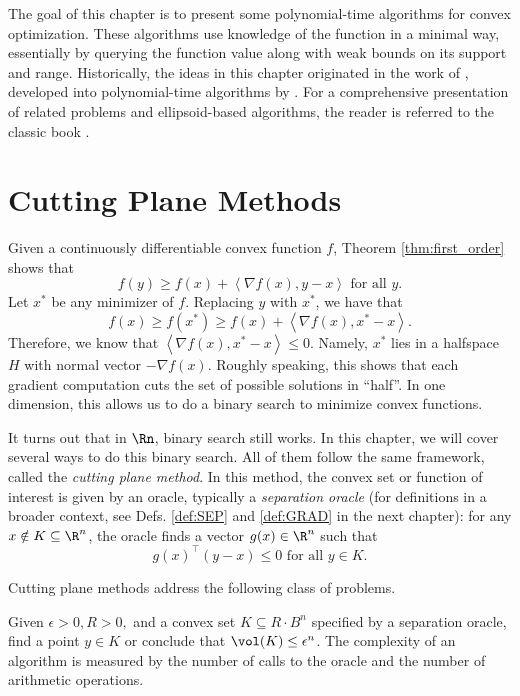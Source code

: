 The goal of this chapter is to present some polynomial-time algorithms
for convex optimization. These algorithms use knowledge of the function
in a minimal way, essentially by querying the function value along
with weak bounds on its support and range. Historically, the ideas
in this chapter originated in the work of \cite{Grunbaum1960,yudin1976evaluation},
developed into polynomial-time algorithms by \cite{khachiyan1980polynomial,grotschel1981ellipsoid,bertsimas2004solving}.
For a comprehensive presentation of related problems and ellipsoid-based
algorithms, the reader is referred to the classic book \cite{grotschel2012geometric}. 

\section{Cutting Plane Methods\label{sec:Cutting-Plane-Methods}}

Given a continuously differentiable convex function $f$, Theorem
\ref{thm:first_order} shows that
\begin{equation}
f(y)\geq f(x)+\left\langle \nabla f(x),y-x\right\rangle \text{ for all }y.\label{eq:sub_grad_def}
\end{equation}
Let $x^{*}$ be any minimizer of $f$. Replacing $y$ with $x^{*}$,
we have that 
\[
f(x)\geq f(x^{*})\geq f(x)+\left\langle \nabla f(x),x^{*}-x\right\rangle .
\]
Therefore, we know that $\left\langle \nabla f(x),x^{*}-x\right\rangle \leq0$.
Namely, $x^{*}$ lies in a halfspace $H$ with normal vector $-\nabla f(x)$.
Roughly speaking, this shows that each gradient computation cuts the
set of possible solutions in ``half''. In one dimension, this allows
us to do a binary search to minimize convex functions. 

It turns out that in $\Rn$, binary search still works. In this chapter,
we will cover several ways to do this binary search. All of them follow
the same framework, called the \emph{cutting plane method}. In this
method, the convex set or function of interest is given by an oracle,
typically a \emph{separation oracle} (for definitions in a broader
context, see Defs. \ref{def:SEP} and \ref{def:GRAD} in the next
chapter): for any $x\notin K\subseteq\R^{n}$, the oracle finds a
vector $g(x)\in\R^{n}$ such that
\[
g(x)^{\top}(y-x)\leq0\text{ for all }y\in K.
\]

Cutting plane methods address the following class of problems.
\begin{problem}
\label{prob:abstract_convex_problem}Given $\epsilon>0,R>0,$ and
a convex set $K\subseteq R\cdot B^{n}$ specified by a separation
oracle, find a point $y\in K$ or conclude that $\vol(K)\leq\epsilon^{n}$.
The complexity of an algorithm is measured by the number of calls
to the oracle and the number of arithmetic operations.
\end{problem}

